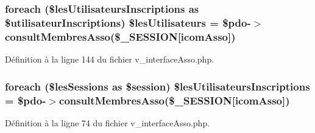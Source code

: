 \subsubsection[{\texorpdfstring{\$les\+Utilisateurs}{$lesUtilisateurs}}]{\setlength{\rightskip}{0pt plus 5cm}foreach (\$les\+Utilisateurs\+Inscriptions as \$utilisateur\+Inscriptions) \$les\+Utilisateurs = \$pdo-\/$>$consult\+Membres\+Asso(\$\+\_\+\+S\+E\+S\+S\+I\+ON\mbox{[}\textquotesingle{}icom\+Asso\textquotesingle{}\mbox{]})}\hypertarget{v__interface_asso_8php_a58ef35582b849c117a143a4d08f602c5}{}\label{v__interface_asso_8php_a58ef35582b849c117a143a4d08f602c5}


Définition à la ligne 144 du fichier v\+\_\+interface\+Asso.\+php.

\subsubsection[{\texorpdfstring{\$les\+Utilisateurs\+Inscriptions}{$lesUtilisateursInscriptions}}]{\setlength{\rightskip}{0pt plus 5cm}foreach (\$les\+Sessions as \$session) \$les\+Utilisateurs\+Inscriptions = \$pdo-\/$>$consult\+Membres\+Asso(\$\+\_\+\+S\+E\+S\+S\+I\+ON\mbox{[}\textquotesingle{}icom\+Asso\textquotesingle{}\mbox{]})}\hypertarget{v__interface_asso_8php_a7d7df1b17930a8f01bcdffe9d2d6d882}{}\label{v__interface_asso_8php_a7d7df1b17930a8f01bcdffe9d2d6d882}


Définition à la ligne 74 du fichier v\+\_\+interface\+Asso.\+php.


